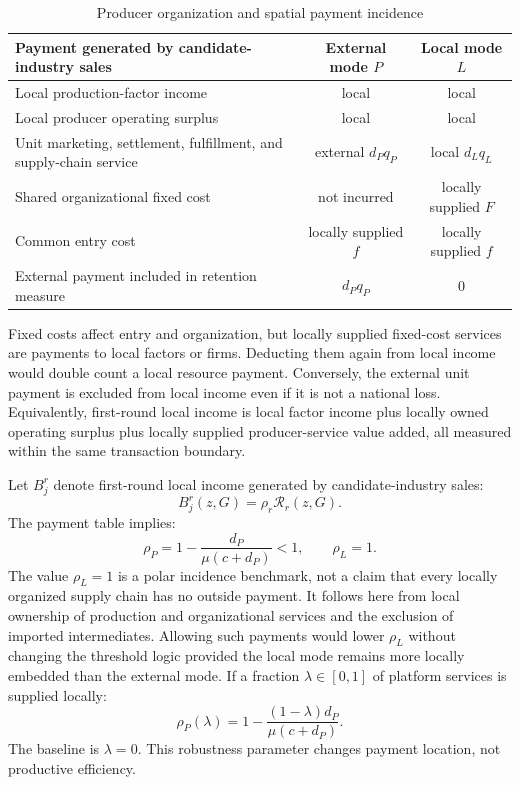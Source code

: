 \documentclass[11pt]{article}
\theoremstyle{definition}
\theoremstyle{remark}
\newcommand{\Rcal}{\mathcal R}
\begin{document}
\begin{table}[htbp]
\centering
\caption{Producer organization and spatial payment incidence}
\label{tab:producer_flows}
\begin{tabular}{p{}cc}
\toprule
Payment generated by candidate-industry sales
& External mode \(P\) & Local mode \(L\)\\
\midrule
Local production-factor income
& local & local\\
Local producer operating surplus
& local & local\\
Unit marketing, settlement, fulfillment, and supply-chain service
& external \(d_Pq_P\) & local \(d_Lq_L\)\\
Shared organizational fixed cost
& not incurred & locally supplied \(F\)\\
Common entry cost
& locally supplied \(f\) & locally supplied \(f\)\\
\midrule
External payment included in retention measure
& \(d_Pq_P\) & \(0\)\\
\bottomrule
\end{tabular}
\end{table}

Fixed costs affect entry and organization, but locally supplied fixed-cost
services are payments to local factors or firms.  Deducting them again from
local income would double count a local resource payment.  Conversely, the
external unit payment is excluded from local income even if it is not a
national loss.  Equivalently, first-round local income is local factor income
plus locally owned operating surplus plus locally supplied producer-service
value added, all measured within the same transaction boundary.

Let \(B_j^r\) denote first-round local income generated by candidate-industry
sales:
\begin{equation}
 B_j^r(z,G)=\rho_r\Rcal_r(z,G).
 \label{eq:producer_local_income}
\end{equation}
The payment table implies:
\begin{equation}
 \rho_P
 =
 1-\frac{d_P}{\mu(c+d_P)}
 <1,
 \qquad
 \rho_L=1.
 \label{eq:producer_retention}
\end{equation}
The value \(\rho_L=1\) is a polar incidence benchmark, not a claim that every
locally organized supply chain has no outside payment.  It follows here from
local ownership of production and organizational services and the exclusion
of imported intermediates.  Allowing such payments would lower \(\rho_L\)
without changing the threshold logic provided the local mode remains more
locally embedded than the external mode.
If a fraction \(\lambda\in[0,1]\) of platform services is supplied locally:
\begin{equation}
 \rho_P(\lambda)
 =
 1-\frac{(1-\lambda)d_P}{\mu(c+d_P)}.
 \label{eq:partial_localization}
\end{equation}
The baseline is \(\lambda=0\).  This robustness parameter changes payment
location, not productive efficiency.
\end{document}
